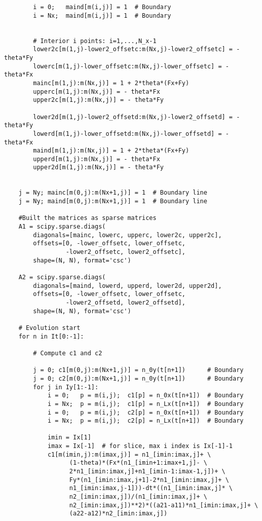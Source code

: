 \begin{lstlisting}
        i = 0;   maind[m(i,j)] = 1  # Boundary
        i = Nx;  maind[m(i,j)] = 1  # Boundary
        
        
        # Interior i points: i=1,...,N_x-1
        lower2c[m(1,j)-lower2_offsetc:m(Nx,j)-lower2_offsetc] = - theta*Fy
        lowerc[m(1,j)-lower_offsetc:m(Nx,j)-lower_offsetc] = - theta*Fx
        mainc[m(1,j):m(Nx,j)] = 1 + 2*theta*(Fx+Fy)
        upperc[m(1,j):m(Nx,j)] = - theta*Fx
        upper2c[m(1,j):m(Nx,j)] = - theta*Fy
        
        lower2d[m(1,j)-lower2_offsetd:m(Nx,j)-lower2_offsetd] = - theta*Fy
        lowerd[m(1,j)-lower_offsetd:m(Nx,j)-lower_offsetd] = - theta*Fx
        maind[m(1,j):m(Nx,j)] = 1 + 2*theta*(Fx+Fy)
        upperd[m(1,j):m(Nx,j)] = - theta*Fx
        upper2d[m(1,j):m(Nx,j)] = - theta*Fy
    
    
    j = Ny; mainc[m(0,j):m(Nx+1,j)] = 1  # Boundary line
    j = Ny; maind[m(0,j):m(Nx+1,j)] = 1  # Boundary line
    
    #Built the matrices as sparse matrices
    A1 = scipy.sparse.diags(
        diagonals=[mainc, lowerc, upperc, lower2c, upper2c],
        offsets=[0, -lower_offsetc, lower_offsetc,
                 -lower2_offsetc, lower2_offsetc],
        shape=(N, N), format='csc')
    
    A2 = scipy.sparse.diags(
        diagonals=[maind, lowerd, upperd, lower2d, upper2d],
        offsets=[0, -lower_offsetc, lower_offsetc,
                 -lower2_offsetd, lower2_offsetd],
        shape=(N, N), format='csc')

    # Evolution start
    for n in It[0:-1]:
        
        # Compute c1 and c2

        j = 0; c1[m(0,j):m(Nx+1,j)] = n_0y(t[n+1])      # Boundary
        j = 0; c2[m(0,j):m(Nx+1,j)] = n_0y(t[n+1])      # Boundary
        for j in Iy[1:-1]:
            i = 0;   p = m(i,j);  c1[p] = n_0x(t[n+1])  # Boundary
            i = Nx;  p = m(i,j);  c1[p] = n_Lx(t[n+1])  # Boundary
            i = 0;   p = m(i,j);  c2[p] = n_0x(t[n+1])  # Boundary
            i = Nx;  p = m(i,j);  c2[p] = n_Lx(t[n+1])  # Boundary
            
            imin = Ix[1]
            imax = Ix[-1]  # for slice, max i index is Ix[-1]-1
            c1[m(imin,j):m(imax,j)] = n1_[imin:imax,j]+ \
                  (1-theta)*(Fx*(n1_[imin+1:imax+1,j]- \
                  2*n1_[imin:imax,j]+n1_[imin-1:imax-1,j])+ \
                  Fy*(n1_[imin:imax,j+1]-2*n1_[imin:imax,j]+ \
                  n1_[imin:imax,j-1]))-dt*((n1_[imin:imax,j]* \
                  n2_[imin:imax,j])/(n1_[imin:imax,j]+ \
                  n2_[imin:imax,j])**2)*((a21-a11)*n1_[imin:imax,j]+ \
                  (a22-a12)*n2_[imin:imax,j])
            

\end{lstlisting}
